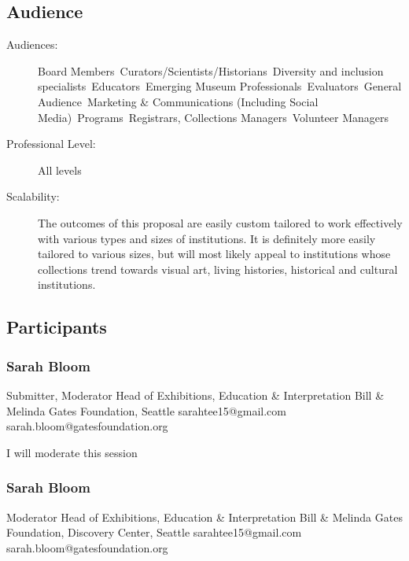 \documentclass{report}
\begin{document}
              \subsection*{Audience}
                \begin{description}
                  \item [Audiences:]Board Members~Curators/Scientists/Historians~Diversity and inclusion specialists~Educators~Emerging Museum Professionals~Evaluators~General Audience~Marketing \& Communications (Including Social Media)~Programs~Registrars, Collections Managers~Volunteer Managers~
                  \item[Professional Level:]All levels~
                \item[Scalability:] The outcomes of this proposal are easily custom tailored to work effectively with various types and sizes of institutions. It is definitely more easily tailored to various sizes, but will most likely appeal to institutions whose collections trend towards visual art, living histories, historical and cultural institutions.


							
              \end{description}
            \subsection*{Participants}
              \subsubsection*{ Sarah Bloom }
              Submitter, Moderator\newline
              Head of Exhibitions, Education \& Interpretation\newline
              Bill \& Melinda Gates Foundation, Seattle
              \newline
              sarahtee15@gmail.com\newline
              sarah.bloom@gatesfoundation.org\newline

              I will moderate this session\newline


              
                \subsubsection*{ Sarah Bloom }
                Moderator\newline
                Head of Exhibitions, Education \& Interpretation\newline
                Bill \& Melinda Gates Foundation, Discovery Center, Seattle
                \newline
                sarahtee15@gmail.com\newline
                sarah.bloom@gatesfoundation.org\newline
\end{document}
